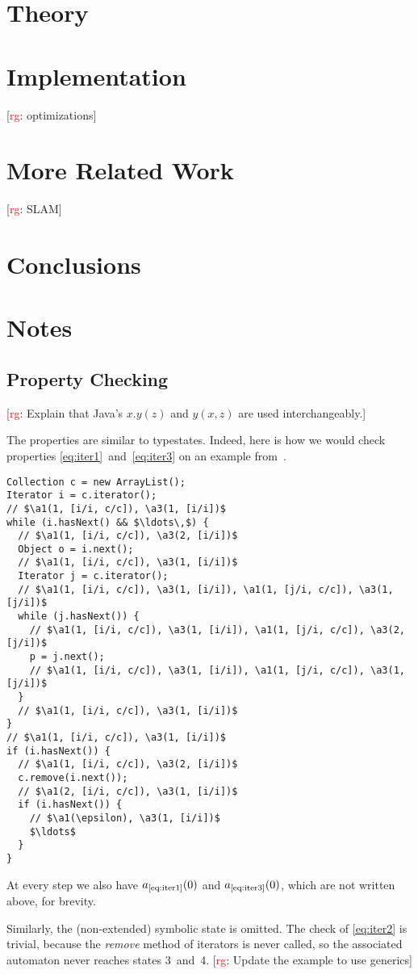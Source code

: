 \documentclass[a4paper]{article}
\newcommand{\todo}[2]{{\small [\textcolor{red}{#1}: #2]}}
\newcommand{\rg}[1]{\todo{rg}{#1}}
\theoremstyle{remark}
\begin{document}
\section{Theory} %

\section{Implementation} %

\rg{optimizations}

\section{More Related Work}

\rg{SLAM}
\section{Conclusions}

\section{Notes} %
\subsection{Property Checking}\label{sec:property_checking} %

\rg{Explain that Java's $x.y(z)$ and $y(x, z)$ are used interchangeably.}

The properties are similar to typestates.
Indeed, here is how we would check properties \eqref{eq:iter1}~and~\eqref{eq:iter3} on an example from~\cite{bierhoff2007}.
{\def\a#1{a_\text{\ref{eq:iter#1}} }
\begin{lstlisting}
Collection c = new ArrayList();
Iterator i = c.iterator();
// $\a1(1, [i/i, c/c]), \a3(1, [i/i])$
while (i.hasNext() && $\ldots\,$) {
  // $\a1(1, [i/i, c/c]), \a3(2, [i/i])$
  Object o = i.next();
  // $\a1(1, [i/i, c/c]), \a3(1, [i/i])$
  Iterator j = c.iterator();
  // $\a1(1, [i/i, c/c]), \a3(1, [i/i]), \a1(1, [j/i, c/c]), \a3(1, [j/i])$
  while (j.hasNext()) {
    // $\a1(1, [i/i, c/c]), \a3(1, [i/i]), \a1(1, [j/i, c/c]), \a3(2, [j/i])$
    p = j.next();
    // $\a1(1, [i/i, c/c]), \a3(1, [i/i]), \a1(1, [j/i, c/c]), \a3(1, [j/i])$
  }
  // $\a1(1, [i/i, c/c]), \a3(1, [i/i])$
}
// $\a1(1, [i/i, c/c]), \a3(1, [i/i])$
if (i.hasNext()) {
  // $\a1(1, [i/i, c/c]), \a3(2, [i/i])$
  c.remove(i.next());
  // $\a1(2, [i/i, c/c]), \a3(1, [i/i])$
  if (i.hasNext()) {
    // $\a1(\epsilon), \a3(1, [i/i])$
    $\ldots$
  }
}
\end{lstlisting}
At every step we also have $\a1(0)$ and $\a3(0)$, which are not written above, for brevity.}
Similarly, the (non-extended) symbolic state is omitted.
The check of \eqref{eq:iter2} is trivial, because the \textit{remove} method of iterators is never called, so the associated automaton never reaches states 3~and~4.
\rg{Update the example to use generics}
\end{document}
